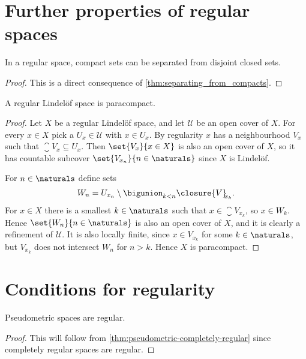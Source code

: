 \documentclass[article, a4paper, 11pt, oneside]{memoir}
\numberwithin{equation}{chapter}
\newcommand{\calU}{\mathcal{U}}
\begin{document}
\section{Further properties of regular spaces}

\begin{proposition}
    In a regular space, compact sets can be separated from disjoint closed sets.
\end{proposition}

\begin{proof}
    This is a direct consequence of \cref{thm:separating_from_compacts}.
\end{proof}


\begin{proposition}
    \label{thm:regular-Lindelof-is-paracompact}
    A regular Lindelöf space is paracompact.
\end{proposition}

\begin{proof}
    Let $X$ be a regular Lindelöf space, and let $\calU$ be an open cover of $X$. For every $x \in X$ pick a $U_x \in \calU$ with $x \in U_x$. By regularity $x$ has a neighbourhood $V_x$ such that $\closure{V}_{\!\!x} \subseteq U_x$. Then $\set{V_x}{x \in X}$ is also an open cover of $X$, so it has countable subcover $\set{V_{x_n}}{n \in \naturals}$ since $X$ is Lindelöf.

    For $n \in \naturals$ define sets
    \begin{equation*}
        W_n = U_{x_n} \setminus \bigunion_{k < n} \closure{V}_{\!\!x_k}.
    \end{equation*}
    For $x \in X$ there is a smallest $k \in \naturals$ such that $x \in \closure{V}_{\!\!x_k}$, so $x \in W_k$. Hence $\set{W_n}{n \in \naturals}$ is also an open cover of $X$, and it is clearly a refinement of $\calU$. It is also locally finite, since $x \in V_{x_k}$ for some $k \in \naturals$, but $V_{x_k}$ does not intersect $W_n$ for $n > k$. Hence $X$ is paracompact.
\end{proof}


\section{Conditions for regularity}

\begin{corollary}
    Pseudometric spaces are regular.
\end{corollary}

\begin{proof}
    This will follow from \cref{thm:pseudometric-completely-regular} since completely regular spaces are regular.
\end{proof}
\end{document}
